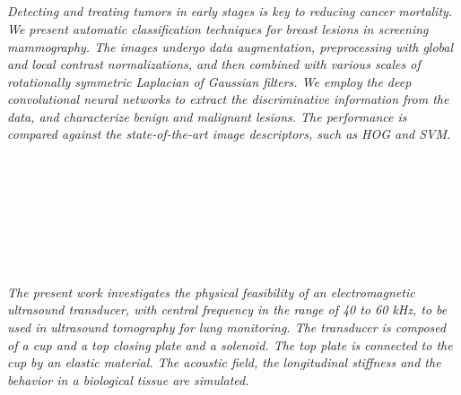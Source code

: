 \begin{multicols}{2}
\\ 
        \\
        \\\\
        \\
        \\\\
        \\
        \\\\
        \\
        \\\\
\\
      \textit{Detecting and treating tumors in early stages is key to reducing cancer mortality. We present automatic classification techniques for breast lesions in screening mammography. The images undergo data augmentation, preprocessing with global and local contrast normalizations, and then combined with various scales of rotationally symmetric Laplacian of Gaussian filters. We employ the deep convolutional neural networks to extract the discriminative information from the data, and characterize benign and malignant lesions. The performance is compared against the state-of-the-art image descriptors, such as HOG and SVM.}\\
\\ 
        \\
        \\\\
        \\
        \\\\
\\
      \textit{The present work investigates the physical feasibility of an electromagnetic ultrasound transducer, with central frequency in the range of 40 to 60 kHz, to be used in ultrasound tomography for lung monitoring. The transducer is composed of a cup and a top closing plate and a solenoid. The top plate is connected to the cup by an elastic material. The acoustic field, the longitudinal stiffness and the behavior in a biological tissue are simulated.}\\
\\ 
        \\

\end{multicols}
